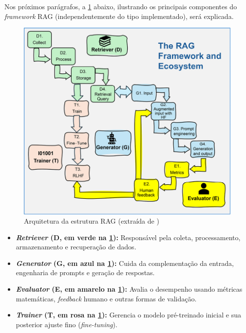 \documentclass[a4paper, 12pt]{article}
\newcommand{\citeb}[1]{\bibleftbracket\cite{#1}\bibrightbracket}
\begin{document}
    Nos próximos parágrafos, a \ref{fig:arquitetura_rag} abaixo, ilustrando os principais componentes do \textit{framework} RAG (independentemente do tipo implementado), será explicada.

    \begin{figure}[h]
        \label{fig:arquitetura_rag}
        \includegraphics[width=\textwidth,height=0.9\textheight,keepaspectratio]{rag-framework-ecosystem-denis-rothman.png}
        \centering
        \caption{Arquitetura da estrutura RAG (extraída de \citeb{rothman})}
        \centering
    \end{figure}

    \begin{itemize}
        \item \textbf{\textit{Retriever} (D, em verde na \ref{fig:arquitetura_rag}):} Responsável pela coleta, processamento, armazenamento e recuperação de dados.
        \item \textbf{\textit{Generator} (G, em azul na \ref{fig:arquitetura_rag}):} Cuida da complementação da entrada, engenharia de prompts e geração de respostas.
        \item \textbf{\textit{Evaluator} (E, em amarelo na \ref{fig:arquitetura_rag}):} Avalia o desempenho usando métricas matemáticas, \textit{feedback} humano e outras formas de validação.
        \item \textbf{\textit{Trainer} (T, em rosa na \ref{fig:arquitetura_rag}):} Gerencia o modelo pré-treinado inicial e sua posterior ajuste fino (\textit{fine-tuning}).
    \end{itemize}
\end{document}

